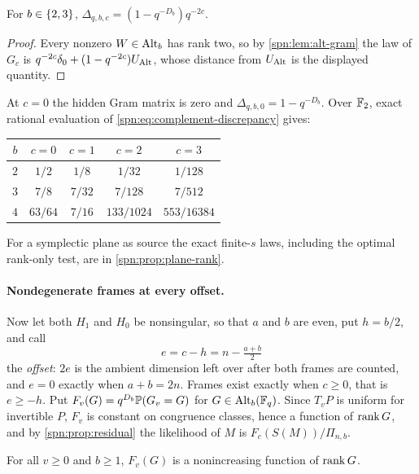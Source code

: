 \begin{corollary}\label{spn:cor:small-source}
For $b\in\{2,3\}$, $\Delta_{q,b,c}=(1-q^{-D_b})q^{-2c}$.
\end{corollary}

\begin{proof}
Every nonzero $W\in\operatorname{Alt}_b$ has rank two, so by \cref{spn:lem:alt-gram} the law of $G_c$ is
$q^{-2c}\delta_0+(1-q^{-2c})U_{\operatorname{Alt}}$, whose distance from $U_{\operatorname{Alt}}$ is the displayed
quantity.
\end{proof}

At $c=0$ the hidden Gram matrix is zero and $\Delta_{q,b,0}=1-q^{-D_b}$. Over $\mathbb{F}_2$, exact
rational evaluation of \eqref{spn:eq:complement-discrepancy} gives:
\begin{center}\small
\begin{tabular}{ccccc}
\toprule
$b$ & $c=0$ & $c=1$ & $c=2$ & $c=3$\\
\midrule
$2$ & $1/2$ & $1/8$ & $1/32$ & $1/128$\\
$3$ & $7/8$ & $7/32$ & $7/128$ & $7/512$\\
$4$ & $63/64$ & $7/16$ & $133/1024$ & $553/16384$\\
\bottomrule
\end{tabular}
\end{center}
For a symplectic plane as source the exact finite-$s$ laws, including the optimal rank-only
test, are in \cref{spn:prop:plane-rank}.

\paragraph{Nondegenerate frames at every offset.}
Now let both $H_1$ and $H_0$ be nonsingular, so that $a$ and $b$ are even, put $h=b/2$, and call
\[
 e=c-h=n-\tfrac{a+b}{2}
\]
the \emph{offset}: $2e$ is the ambient dimension left over after both frames are counted, and
$e=0$ exactly when $a+b=2n$. Frames exist exactly when $c\ge0$, that is $e\ge-h$. Put
$F_v(G)=q^{D_b}\mathbb{P}(G_v=G)$ for $G\in\operatorname{Alt}_b(\mathbb{F}_q)$. Since $T_vP$ is uniform for invertible
$P$, $F_v$ is constant on congruence classes, hence a function of $\operatorname{rank} G$, and by
\cref{spn:prop:residual} the likelihood of $M$ is $F_c(S(M))/\Pi_{n,b}$.

\begin{lemma}\label{spn:lem:gram-monotone}
For all $v\ge0$ and $b\ge1$, $F_v(G)$ is a nonincreasing function of $\operatorname{rank} G$.
\end{lemma}

